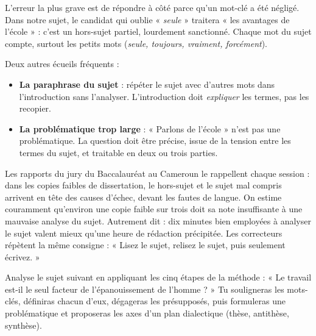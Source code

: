 \documentclass[11pt]{article}
\newcounter{popsec}
\newcounter{popsub}
\newcommand{\courssub}[1]{%
  \stepcounter{popsub}%
  \par\vspace{9pt}\noindent{\popxbold\fontsize{11.5}{13}\selectfont\color{popink}{\color{poporange}\thepopsec.\thepopsub}\hspace{6pt}#1}\par\nopagebreak\vspace{4pt}
}
\begin{document}
\courssub{Les erreurs à éviter}

\begin{attention}
L'erreur la plus grave est de répondre à côté parce qu'un mot-clé a été négligé. Dans notre sujet, le candidat qui oublie « \emph{seule} » traitera « les avantages de l'école » : c'est un hors-sujet partiel, lourdement sanctionné. Chaque mot du sujet compte, surtout les petits mots (\emph{seule, toujours, vraiment, forcément}).
\end{attention}

\begin{attention}
Deux autres écueils fréquents :
\begin{itemize}
\item \textbf{La paraphrase du sujet} : répéter le sujet avec d'autres mots dans l'introduction sans l'analyser. L'introduction doit \emph{expliquer} les termes, pas les recopier.
\item \textbf{La problématique trop large} : « Parlons de l'école » n'est pas une problématique. La question doit être précise, issue de la tension entre les termes du sujet, et traitable en deux ou trois parties.
\end{itemize}
\end{attention}

\begin{savaistu}
Les rapports du jury du Baccalauréat au Cameroun le rappellent chaque session : dans les copies faibles de dissertation, le hors-sujet et le sujet mal compris arrivent en tête des causes d'échec, devant les fautes de langue. On estime couramment qu'environ une copie faible sur trois doit sa note insuffisante à une mauvaise analyse du sujet. Autrement dit : dix minutes bien employées à analyser le sujet valent mieux qu'une heure de rédaction précipitée. Les correcteurs répètent la même consigne : « Lisez le sujet, relisez le sujet, puis seulement écrivez. »
\end{savaistu}

\begin{exercice}
Analyse le sujet suivant en appliquant les cinq étapes de la méthode : « Le travail est-il le seul facteur de l'épanouissement de l'homme ? » Tu souligneras les mots-clés, définiras chacun d'eux, dégageras les présupposés, puis formuleras une problématique et proposeras les axes d'un plan dialectique (thèse, antithèse, synthèse).
\end{exercice}
\end{document}
